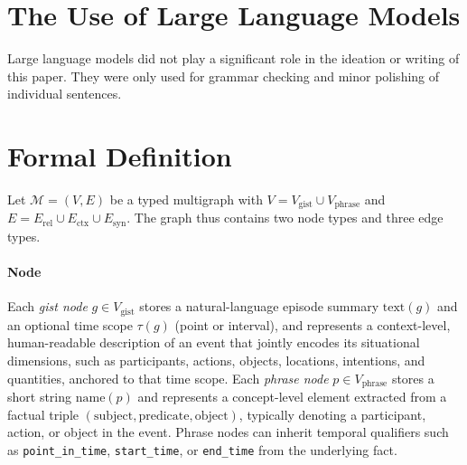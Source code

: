 \documentclass{article} %
\newcommand\AppendixTOC{ \startcontents \printcontents{}{1}{\noindent\textbf{\Large Appendix Contents}\vspace{4pt}} }
\begin{document}



\clearpage
\appendix
\AppendixTOC

\section{The Use of Large Language Models}

Large language models did not play a significant role in the ideation or writing of this paper. They were only used for grammar checking and minor polishing of individual sentences.

\section{Formal Definition}


Let $\mathcal{M}=(V,E)$ be a typed multigraph with
$V = V_{\text{gist}} \cup V_{\text{phrase}}$ and
$E = E_{\text{rel}} \cup E_{\text{ctx}} \cup E_{\text{syn}}$.
The graph thus contains two node types and three edge types.

\paragraph{Node}
Each \textit{gist node} $g \in V_{\text{gist}}$ stores a natural-language episode summary $\text{text}(g)$ and an optional time scope $\tau(g)$ (point or interval), and represents a context-level, human-readable description of an event that jointly encodes its situational dimensions, such as participants, actions, objects, locations, intentions, and quantities, anchored to that time scope.
Each \textit{phrase node} $p \in V_{\text{phrase}}$ stores a short string $\text{name}(p)$ and represents a concept-level element extracted from a factual triple $(\text{subject}, \text{predicate}, \text{object})$, typically denoting a participant, action, or object in the event.
Phrase nodes can inherit temporal qualifiers such as \texttt{point\_in\_time}, \texttt{start\_time}, or \texttt{end\_time} from the underlying fact.
\end{document}
